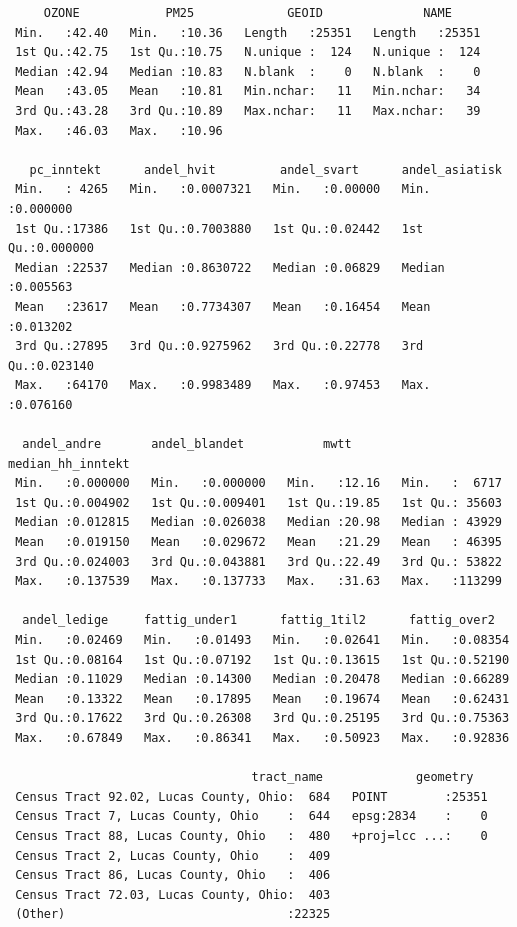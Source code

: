 \documentclass[
  norsk,
  a4paper,
]{article}
\begin{document}
\begin{verbatim}
     OZONE            PM25             GEOID              NAME      
 Min.   :42.40   Min.   :10.36   Length   :25351   Length   :25351  
 1st Qu.:42.75   1st Qu.:10.75   N.unique :  124   N.unique :  124  
 Median :42.94   Median :10.83   N.blank  :    0   N.blank  :    0  
 Mean   :43.05   Mean   :10.81   Min.nchar:   11   Min.nchar:   34  
 3rd Qu.:43.28   3rd Qu.:10.89   Max.nchar:   11   Max.nchar:   39  
 Max.   :46.03   Max.   :10.96                                      
                                                                    
   pc_inntekt      andel_hvit         andel_svart      andel_asiatisk    
 Min.   : 4265   Min.   :0.0007321   Min.   :0.00000   Min.   :0.000000  
 1st Qu.:17386   1st Qu.:0.7003880   1st Qu.:0.02442   1st Qu.:0.000000  
 Median :22537   Median :0.8630722   Median :0.06829   Median :0.005563  
 Mean   :23617   Mean   :0.7734307   Mean   :0.16454   Mean   :0.013202  
 3rd Qu.:27895   3rd Qu.:0.9275962   3rd Qu.:0.22778   3rd Qu.:0.023140  
 Max.   :64170   Max.   :0.9983489   Max.   :0.97453   Max.   :0.076160  
                                                                         
  andel_andre       andel_blandet           mwtt       median_hh_inntekt
 Min.   :0.000000   Min.   :0.000000   Min.   :12.16   Min.   :  6717   
 1st Qu.:0.004902   1st Qu.:0.009401   1st Qu.:19.85   1st Qu.: 35603   
 Median :0.012815   Median :0.026038   Median :20.98   Median : 43929   
 Mean   :0.019150   Mean   :0.029672   Mean   :21.29   Mean   : 46395   
 3rd Qu.:0.024003   3rd Qu.:0.043881   3rd Qu.:22.49   3rd Qu.: 53822   
 Max.   :0.137539   Max.   :0.137733   Max.   :31.63   Max.   :113299   
                                                                        
  andel_ledige     fattig_under1      fattig_1til2      fattig_over2    
 Min.   :0.02469   Min.   :0.01493   Min.   :0.02641   Min.   :0.08354  
 1st Qu.:0.08164   1st Qu.:0.07192   1st Qu.:0.13615   1st Qu.:0.52190  
 Median :0.11029   Median :0.14300   Median :0.20478   Median :0.66289  
 Mean   :0.13322   Mean   :0.17895   Mean   :0.19674   Mean   :0.62431  
 3rd Qu.:0.17622   3rd Qu.:0.26308   3rd Qu.:0.25195   3rd Qu.:0.75363  
 Max.   :0.67849   Max.   :0.86341   Max.   :0.50923   Max.   :0.92836  
                                                                        
                                  tract_name             geometry    
 Census Tract 92.02, Lucas County, Ohio:  684   POINT        :25351  
 Census Tract 7, Lucas County, Ohio    :  644   epsg:2834    :    0  
 Census Tract 88, Lucas County, Ohio   :  480   +proj=lcc ...:    0  
 Census Tract 2, Lucas County, Ohio    :  409                        
 Census Tract 86, Lucas County, Ohio   :  406                        
 Census Tract 72.03, Lucas County, Ohio:  403                        
 (Other)                               :22325                        
\end{verbatim}
\end{document}
